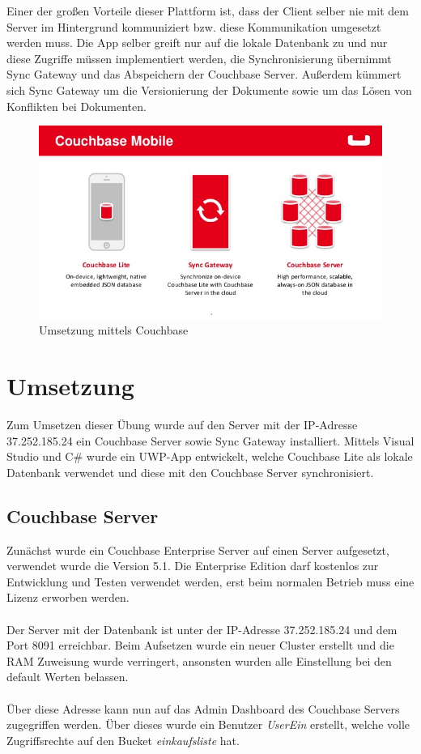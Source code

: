 Einer der großen Vorteile dieser Plattform ist, dass der Client selber nie mit dem Server im Hintergrund kommuniziert bzw. diese Kommunikation umgesetzt werden muss. Die App selber greift nur auf die lokale Datenbank zu und nur diese Zugriffe müssen implementiert werden, die Synchronisierung übernimmt Sync Gateway und das Abspeichern der Couchbase Server. Außerdem kümmert sich Sync Gateway um die Versionierung der Dokumente sowie um das Lösen von Konflikten bei Dokumenten. \cite{couchbaseapp}


\begin{figure}[H]
	\centering
	\includegraphics[width=0.95\linewidth]{img/building-net-apps-using-couchbase-lite-4-638}
	\caption{Umsetzung mittels Couchbase}
	\label{fig:building-net-apps-using-couchbase-lite-4-638}
\end{figure}


\section{Umsetzung}

Zum Umsetzen dieser Übung wurde auf den Server mit der IP-Adresse 37.252.185.24 ein Couchbase Server sowie Sync Gateway installiert. Mittels Visual Studio und C\# wurde ein UWP-App entwickelt, welche Couchbase Lite als lokale Datenbank verwendet und diese mit den Couchbase Server synchronisiert.

\subsection{Couchbase Server}

Zunächst wurde ein Couchbase Enterprise Server auf einen Server aufgesetzt, verwendet wurde die Version 5.1. Die Enterprise Edition darf kostenlos zur Entwicklung und Testen verwendet werden, erst beim normalen Betrieb muss eine Lizenz erworben werden.
\\\\
Der Server mit der Datenbank ist unter der IP-Adresse 37.252.185.24 und dem Port 8091 erreichbar. Beim Aufsetzen wurde ein neuer Cluster erstellt und die RAM Zuweisung wurde verringert, ansonsten wurden alle Einstellung bei den default Werten belassen.
\\\\
Über diese Adresse kann nun auf das Admin Dashboard des Couchbase Servers zugegriffen werden. Über dieses wurde ein Benutzer \textit{UserEin} erstellt, welche volle Zugriffsrechte auf den Bucket \textit{einkaufsliste} hat. \cite{couchbaseintro}


